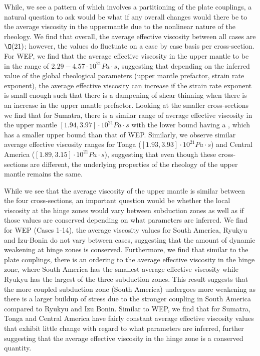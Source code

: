 \documentclass[12pt]{article}
\begin{document}
{While, we see a pattern of which involves a partitioning of the plate couplings, a natural question to ask would be what if any overall changes would there be to the average viscosity in the uppermantle due to the nonlinear nature of the rheology. We find that overall, the average effective viscosity between all cases are $\mathcal{\O}(21)$; however, the values do fluctuate on a case by case basis per cross-section. For WEP, we find that the average effective viscosity in the upper mantle to be in the range of $2.29-4.57 \cdot 10^{21}Pa\cdot s$, suggesting that depending on the inferred value of the global rheological parameters (upper mantle prefactor, strain rate exponent), the average effective viscosity can increase if the strain rate exponent is small enough such that there is a dampening of shear thinning when there is an increase in the upper mantle prefactor. Looking at the smaller cross-sections we find that for Sumatra, there is a similar range of average effective viscosity in the upper mantle $[1.94,3.97]\cdot 10^{21}Pa\cdot s$ with the lower bound having a , which has a smaller upper bound than that of WEP. Similarly, we observe similar average effective viscosity ranges for Tonga ($[1.93,3.93]\cdot 10^{21}Pa\cdot s$) and Central America ($[1.89,3.15]\cdot 10^{21}Pa\cdot s$), suggesting that even though these cross-sections are different, the underlying properties of the rheology of the upper mantle remains the same.

While we see that the average viscosity of the upper mantle is similar between the four cross-sections, an important question would be whether the local viscosity at the hinge zones would vary between subduction zones as well as if those values are conserved depending on what parameters are inferred. We find for WEP (Cases 1-14), the average viscosity values for South America, Ryukyu and Izu-Bonin do not vary between cases, suggesting that the amount of dynamic weakening at hinge zones is conserved. Furthermore, we find that similar to the plate couplings, there is an ordering to the average effective viscosity in the hinge zone, where South America has the smallest average effective viscosity while Ryukyu has the largest of the three subduction zones. This result suggests that the more coupled subduction zone (South America) undergoes more weakening as there is a larger buildup of stress due to the stronger coupling in South America compared to Ryukyu and Izu Bonin.  Similar to WEP, we find that for Sumatra, Tonga and Central America have fairly constant average effective viscosity values that exhibit little change with regard to what parameters are inferred, further suggesting that the average effective viscosity in the hinge zone is a conserved quantity.

}
\end{document}
